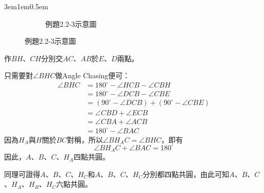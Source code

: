 \documentclass[12pt]{article}
\begin{document}
\begin{mybox}[解]{3em}{1em}{0.5em}
    \begin{figure}[H]
        \begin{subfigure}[b]{\textwidth}
            \centering
            \label{fig:Angle_s2.2-7}
            \caption{例題2.2-3示意圖}
        \end{subfigure}              
    \end{figure}
    作$BH$、$CH$分別交$AC$、$AB$於$E$、$D$兩點。

    只需要對$\angle{BHC}$做Angle Chasing便可：
    \begin{align*}
        \angle{BHC}&=180^{\circ}-\angle{HCB}-\angle{CBH}\\
        &=180^{\circ}-\angle{DCB}-\angle{CBE}\\
        &=\left(90^{\circ}-\angle{DCB}\right)+\left(90^{\circ}-\angle{CBE}\right)\\
        &=\angle{CBD}+\angle{ECB}\\
        &=\angle{CBA}+\angle{ACB}\\
        &=180^{\circ}-\angle{BAC}
    \end{align*}
    因為$H_A$與$H$關於$BC$對稱，所以$\angle{BH_AC}=\angle{BHC}$，即有
    $$
        \angle{BH_AC}+\angle{BAC}=180^{\circ}
    $$
    因此，$A$、$B$、$C$、$H_A$四點共圓。

    同理可證得$A$、$B$、$C$、$H_C$和$A$、$B$、$C$、$H_C$分別都四點共圓，由此可知$A$、$B$、$C$、$H_A$、$H_B$、$H_C$六點共圓。
\end{mybox}
\end{document}
